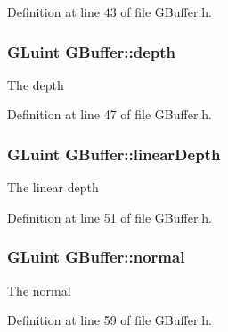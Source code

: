 Definition at line 43 of file G\+Buffer.\+h.

\subsubsection[{\texorpdfstring{depth}{depth}}]{\setlength{\rightskip}{0pt plus 5cm}G\+Luint G\+Buffer\+::depth\hspace{0.3cm}{\ttfamily [private]}}\hypertarget{class_g_buffer_a2614dc7c37735282d8b86133c816bfd8}{}\label{class_g_buffer_a2614dc7c37735282d8b86133c816bfd8}


The depth 



Definition at line 47 of file G\+Buffer.\+h.

\subsubsection[{\texorpdfstring{linear\+Depth}{linearDepth}}]{\setlength{\rightskip}{0pt plus 5cm}G\+Luint G\+Buffer\+::linear\+Depth\hspace{0.3cm}{\ttfamily [private]}}\hypertarget{class_g_buffer_a2833d3d68f1ee08aa227f9ce6f5ac935}{}\label{class_g_buffer_a2833d3d68f1ee08aa227f9ce6f5ac935}


The linear depth 



Definition at line 51 of file G\+Buffer.\+h.

\subsubsection[{\texorpdfstring{normal}{normal}}]{\setlength{\rightskip}{0pt plus 5cm}G\+Luint G\+Buffer\+::normal\hspace{0.3cm}{\ttfamily [private]}}\hypertarget{class_g_buffer_a4802469ac9b39db3eb445ee8161a2d40}{}\label{class_g_buffer_a4802469ac9b39db3eb445ee8161a2d40}


The normal 



Definition at line 59 of file G\+Buffer.\+h.

